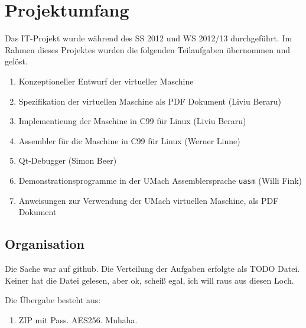 \section{Projektumfang}

Das IT-Projekt wurde während des SS 2012 und WS 2012/13 durchgeführt. Im Rahmen
dieses Projektes wurden die folgenden Teilaufgaben übernommen und gelöst.

\begin{enumerate}
\item Konzeptioneller Entwurf der virtueller Maschine
\item Spezifikation der virtuellen Maschine als PDF Dokument (Liviu Beraru)
\item Implementieung der Maschine in C99 für Linux (Liviu Beraru)
\item Assembler für die Maschine in C99 für Linux (Werner Linne)
\item Qt-Debugger (Simon Beer)
\item Demonstrationsprogramme in der UMach Assemblersprache \texttt{uasm} (Willi
Fink)
\item Anweisungen zur Verwendung der UMach virtuellen Maschine, als PDF
Dokument
\end{enumerate}


\subsection{Organisation}

Die Sache war auf github. Die Verteilung der Aufgaben erfolgte als TODO Datei.
Keiner hat die Datei gelesen, aber ok, scheiß egal, ich will raus aus diesen
Loch.

Die Übergabe besteht aus:

\begin{enumerate}
  \item ZIP mit Pass. AES256. Muhaha.
\end{enumerate}







